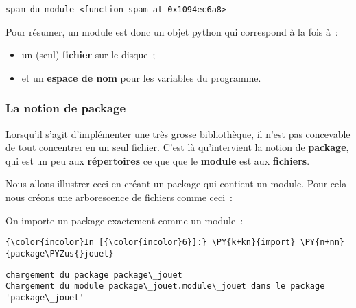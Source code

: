     \begin{Verbatim}[commandchars=\\\{\},frame=single,framerule=0.3mm,rulecolor=\color{cellframecolor}]
spam du module <function spam at 0x1094ec6a8>
\end{Verbatim}

    Pour résumer, un module est donc un objet python qui correspond à la
fois à~:

\begin{itemize}
\tightlist
\item
  un (seul) \textbf{fichier} sur le disque~;
\item
  et un \textbf{espace de nom} pour les variables du programme.
\end{itemize}

    \hypertarget{la-notion-de-package}{%
\subsubsection{La notion de package}\label{la-notion-de-package}}

    Lorsqu'il s'agit d'implémenter une très grosse bibliothèque, il n'est
pas concevable de tout concentrer en un seul fichier. C'est là
qu'intervient la notion de \textbf{package}, qui est un peu aux
\textbf{répertoires} ce que que le \textbf{module} est aux
\textbf{fichiers}.

    Nous allons illustrer ceci en créant un package qui contient un module.
Pour cela nous créons une arborescence de fichiers comme ceci~:

\begin{Shaded}
\begin{Highlighting}[frame=lines,framerule=0.6mm,rulecolor=\color{asisframecolor}]
\end{Highlighting}
\end{Shaded}

    On importe un package exactement comme un module~:

    \begin{Verbatim}[commandchars=\\\{\},frame=single,framerule=0.3mm,rulecolor=\color{cellframecolor}]
{\color{incolor}In [{\color{incolor}6}]:} \PY{k+kn}{import} \PY{n+nn}{package\PYZus{}jouet}
\end{Verbatim}


    \begin{Verbatim}[commandchars=\\\{\},frame=single,framerule=0.3mm,rulecolor=\color{cellframecolor}]
chargement du package package\_jouet
Chargement du module package\_jouet.module\_jouet dans le package 'package\_jouet'
\end{Verbatim}

